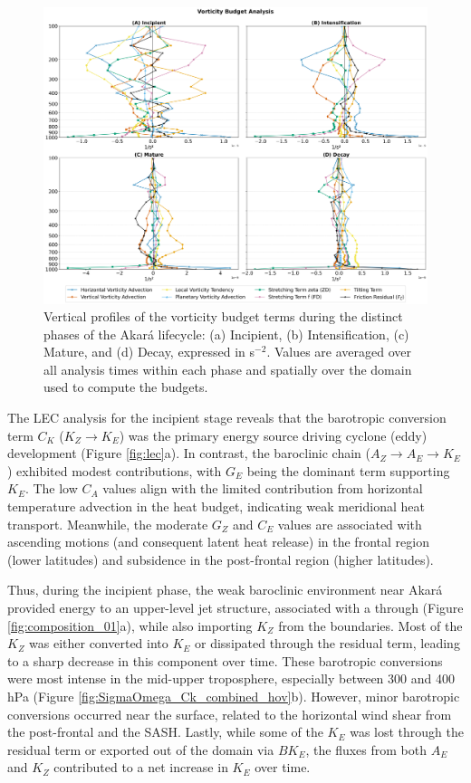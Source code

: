 \documentclass[pdflatex,sn-chicago]{sn-jnl}%
\theoremstyle{plain}
\theoremstyle{definition}
\theoremstyle{remark}
\theoremstyle{definition}
\begin{document}
\begin{figure}[h!]
\centering
\includegraphics[width=\textwidth]{Vorticity_Budget_Combined_2x2.png}
\caption{Vertical profiles of the vorticity budget terms during the distinct phases of the Akará lifecycle: (a) Incipient, (b) Intensification, (c) Mature, and (d) Decay, expressed in s\(^{-2}\). Values are averaged over all analysis times within each phase and spatially over the domain used to compute the budgets.}
\label{fig:Vorticity_Budget_Combined_2x2}
\end{figure}


The LEC analysis for the incipient stage reveals that the barotropic conversion term $C_K$ ($K_Z \rightarrow K_E$) was the primary energy source driving cyclone (eddy) development (Figure \ref{fig:lec}a). In contrast, the baroclinic chain ($A_Z \rightarrow A_E \rightarrow K_E$) exhibited modest contributions, with $G_E$ being the dominant term supporting $K_E$. The low $C_A$ values align with the limited contribution from horizontal temperature advection in the heat budget, indicating weak meridional heat transport. Meanwhile, the moderate $G_Z$ and $C_E$ values are associated with ascending motions (and consequent latent heat release) in the frontal region (lower latitudes) and subsidence in the post-frontal region (higher latitudes).


Thus, during the incipient phase, the weak baroclinic environment near Akará provided energy to an upper-level jet structure, associated with a through (Figure \ref{fig:composition_01}a), while also importing $K_Z$ from the boundaries. Most of the $K_Z$ was either converted into $K_E$ or dissipated through the residual term, leading to a sharp decrease in this component over time. These barotropic conversions were most intense in the mid-upper troposphere, especially between 300 and 400 hPa (Figure \ref{fig:SigmaOmega_Ck_combined_hov}b). However, minor barotropic conversions occurred near the surface, related to the horizontal wind shear from the post-frontal and the SASH. Lastly, while some of the $K_E$ was lost through the residual term or exported out of the domain via $BK_E$, the fluxes from both $A_E$ and $K_Z$ contributed to a net increase in $K_E$ over time.
\end{document}

